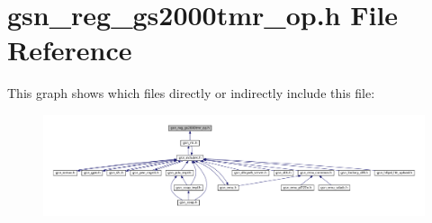 \hypertarget{a00555}{
\section{gsn\_\-reg\_\-gs2000tmr\_\-op.h File Reference}
\label{a00555}
}
This graph shows which files directly or indirectly include this file:
\nopagebreak
\begin{figure}[H]
\begin{center}
\leavevmode
\includegraphics[width=400pt]{a00791}
\end{center}
\end{figure}

